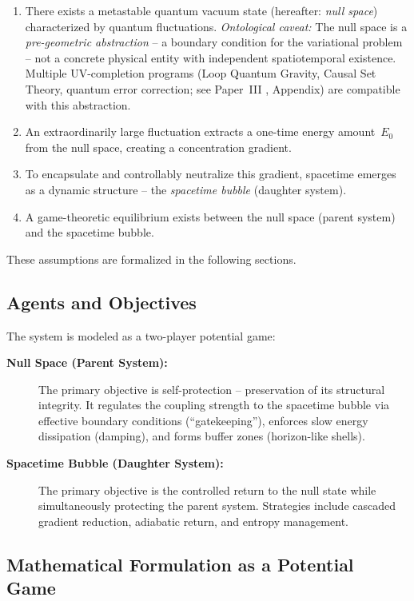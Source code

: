 \documentclass[aps,prd,twocolumn,superscriptaddress,nofootinbib]{revtex4-2}
\begin{document}
\begin{enumerate}
\item There exists a metastable quantum vacuum state (hereafter: \textit{null space}) characterized by quantum fluctuations. \textit{Ontological caveat:} The null space is a \emph{pre-geometric abstraction} -- a boundary condition for the variational problem -- not a concrete physical entity with independent spatiotemporal existence. Multiple UV-completion programs (Loop Quantum Gravity, Causal Set Theory, quantum error correction; see Paper~III \cite{Geiger2026c}, Appendix) are compatible with this abstraction.
\item An extraordinarily large fluctuation extracts a one-time energy amount~$E_0$ from the null space, creating a concentration gradient.
\item To encapsulate and controllably neutralize this gradient, spacetime emerges as a dynamic structure -- the \textit{spacetime bubble} (daughter system).
\item A game-theoretic equilibrium exists between the null space (parent system) and the spacetime bubble.
\end{enumerate}

These assumptions are formalized in the following sections.

\subsection{Agents and Objectives}
\label{subsec:agents}

The system is modeled as a two-player potential game:

\begin{description}
\item[\textbf{Null Space (Parent System):}] The primary objective is self-protection -- preservation of its structural integrity. It regulates the coupling strength to the spacetime bubble via effective boundary conditions (``gatekeeping''), enforces slow energy dissipation (damping), and forms buffer zones (horizon-like shells).
\item[\textbf{Spacetime Bubble (Daughter System):}] The primary objective is the controlled return to the null state while simultaneously protecting the parent system. Strategies include cascaded gradient reduction, adiabatic return, and entropy management.
\end{description}

\subsection{Mathematical Formulation as a Potential Game}
\label{subsec:potentialgame}
\end{document}

